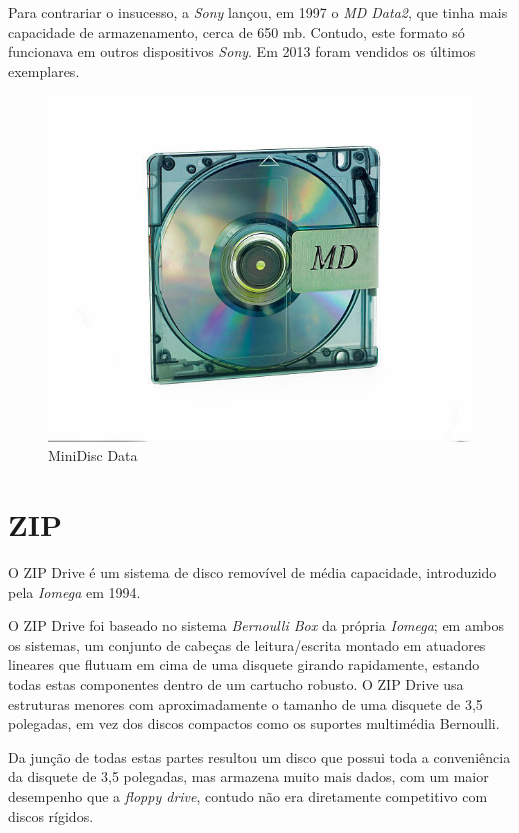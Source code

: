\documentclass{report}
\begin{document}
	Para contrariar o insucesso, a \textit{Sony} lançou, em 1997 o \textit{MD Data2}, que tinha mais capacidade de armazenamento, cerca de 650 \ac{mb}. Contudo, este formato só funcionava em outros dispositivos \textit{Sony}.
	Em 2013 foram vendidos os últimos exemplares.	

\begin{figure} [h]
	\centering
	\includegraphics[scale=0.4]{MD_data.jpg}
	\caption{MiniDisc Data}
\end{figure}

\newpage	
			
		\section{ZIP}
	
	O ZIP Drive é um sistema de disco removível de média capacidade, introduzido pela \textit{Iomega} em 1994.
\vspace{1mm}

	O ZIP Drive foi baseado no sistema \textit{Bernoulli Box} da própria \textit{Iomega}; em ambos os sistemas, um conjunto de cabeças de leitura/escrita montado em atuadores lineares que flutuam em cima de uma disquete girando rapidamente, estando todas estas componentes dentro de um cartucho robusto. O ZIP Drive usa estruturas menores com aproximadamente o tamanho de uma disquete de 3,5 polegadas, em vez dos discos compactos como os suportes multimédia Bernoulli.
\vspace{1mm}

	Da junção de todas estas partes resultou um disco que possui toda a conveniência da disquete de 3,5 polegadas, mas armazena muito mais dados, com um maior desempenho que a \textit{floppy drive}, contudo não era diretamente competitivo com discos rígidos.
\vspace{1mm}
	
\end{document}
